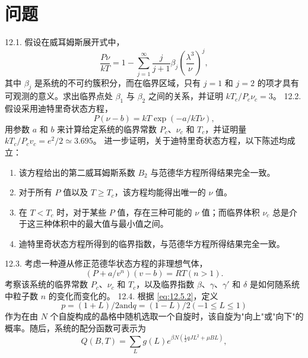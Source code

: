 \section{问题}\label{ux95eeux9898_chap12}
12.1. 假设在威耳姆斯展开式中，
\begin{equation}\tag{12.13.17}\label{eq:12.13.17}
\frac { P \nu } { k T } = 1 - \sum _ { j = 1 } ^{\infty} \frac { j } { j + 1 } \beta _ { j } \left( \frac { \lambda ^{3} } { \nu } \right) ^{j} ,
\end{equation}
其中 \(\beta_{j}\) 是系统的不可约簇积分，而在临界区域，只有 \(j=1\) 和 \(j=2\) 的项才具有可观测的意义。求出临界点处 \(\beta_{1}\) 与 \(\beta_{2}\) 之间的关系，并证明 \(kT_{c}/P_{c}\nu_{c}=3\)。
12.2. 假设采用迪特里奇状态方程，
\begin{equation}\tag{12.13.18}\label{eq:12.13.18}
P ( \nu - b ) = k T \exp ( - a / k T \nu ) ,
\end{equation}
用参数 \(a\) 和 \(b\) 来计算给定系统的临界常数 \(P_{c}\)、\(\nu_{c}\) 和 \(T_{c}\)，并证明量 \(kT_{c}/P_{c}v_{c}=e^{2}/2\simeq3.695\)。
进一步证明，关于迪特里奇状态方程，以下陈述均成立：
\begin{enumerate}
\def\labelenumi{(\alph{enumi})}
\item
  该方程给出的第二威耳姆斯系数 \(B_{2}\) 与范德华方程所得结果完全一致。
\item
  对于所有 \(P\) 值以及 \(T \geq T_{c}\)，该方程均能得出唯一的 \(\nu\) 值。
\item
  在 \(T < T_{c}\) 时，对于某些 \(P\) 值，存在三种可能的 \(\nu\) 值；而临界体积 \(\nu_{c}\) 总是介于这三种体积中的最大值与最小值之间。
\item
  迪特里奇状态方程所得到的临界指数，与范德华方程所得结果完全一致。
\end{enumerate}
12.3. 考虑一种遵从修正范德华状态方程的非理想气体，
\begin{equation}\tag{12.13.19}\label{eq:12.13.19}
( P + a / v ^{n} ) ( v - b ) = R T  ( n > 1 ) .
\end{equation}
考察该系统的临界常数 \(P_{c}\)、\(\nu_{c}\) 和 \(T_{c}\)，以及临界指数 \(\beta\)、\(\gamma\)、\(\gamma'\) 和 \(\delta\) 是如何随系统中粒子数 \(n\) 的变化而变化的。
12.4. 根据 \autoref{eq:12.5.2}，定义
\begin{equation}\tag{12.13.20}\label{eq:12.13.20}
p = ( 1 + L ) / 2  { \mathrm { a n d } }  q = ( 1 - L ) / 2  ( - 1 \leq L \leq 1 )
\end{equation}
作为在由 \(N\) 个自旋构成的晶格中随机选取一个自旋时，该自旋为"向上"或"向下"的概率。随后，系统的配分函数可表示为
\begin{equation}\tag{12.13.21}\label{eq:12.13.21}
Q ( B , T ) = \sum _ { L } g ( L ) e ^{\beta N ( \frac { 1} { 2 } q J L ^{2} + \mu B L ) } ,
\end{equation}
